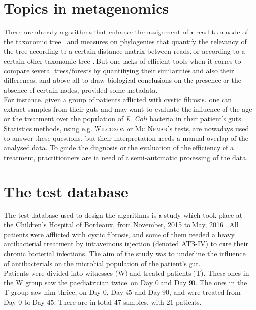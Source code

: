 \documentclass{report}
\begin{document}
\section{Topics in metagenomics}

There are already algorithms that enhance the assignment of a read to a node of the taxonomic tree \cite{Tango1}, and measures on phylogenies that quantify the relevancy of the tree according to a certain distance matrix between reads, or according to a certain other taxonomic tree \cite{RobinsonFoulds} \cite{Alignment}. But one lacks of efficient tools \cite{Enaud} when it comes to compare several trees/forests by quantifiying their similarities and also their differences, and above all to draw biological conclusions on the presence or the absence of certain nodes, provided some metadata.\\

For instance, given a group of patients afflicted with cystic fibrosis, one can extract samples from their guts and may want to evaluate the influence of the age or the treatment over the population of \emph{E. Coli} bacteria in their patient's guts. Statistics methods, using e.g. \textsc{Wilcoxon} \cite{Wilcoxon} \cite{Whitney} or \textsc{Mc Nemar}'s \cite{McNemar} tests, are nowadays used to answer these questions, but their interpretation needs a manual overlap of the analysed data. To guide the diagnosis or the evaluation of the efficiency of a treatment, practitionners are in need of a semi-automatic processing of the data.

\section{The test database}

The test database used to design the algorithms is a study which took place at the Children's Hospital of Bordeaux, from November, 2015 to May, 2016 \cite{Enaud}. All patients were afflicted with cystic fibrosis, and some of them needed a heavy antibacterial treatment by intraveinous injection (denoted ATB-IV) to cure their chronic bacterial infections. The aim of the study was to underline the influence of antibacterials on the microbial population of the patient's gut.\\

Patients were divided into witnesses (\textsc{W}) and treated patients (\textsc{T}). These ones in the \textsc{W} group saw the paediatrician twice, on Day $0$ and Day $90$. The ones in the \textsc{T} group saw him thrice, on Day $0$, Day $45$ and Day $90$, and were treated from Day $0$ to Day $45$. There are in total $47$ samples, with $21$ patients.\\
\end{document}
